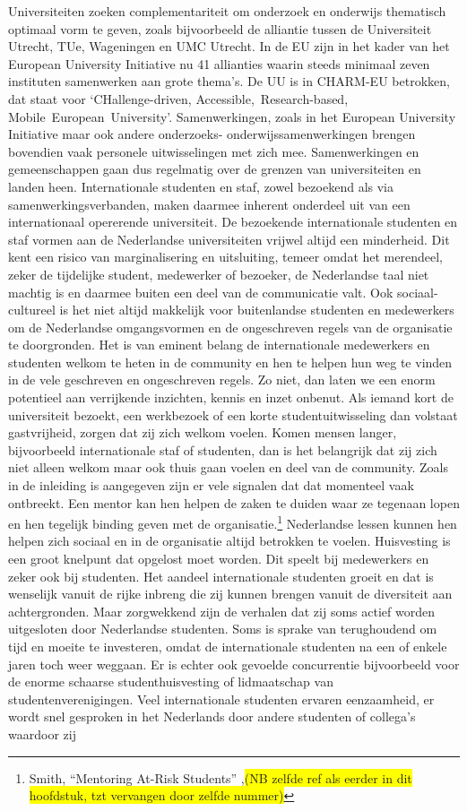 \documentclass{jote-book}
\begin{document}
	Universiteiten zoeken complementariteit om onderzoek en onderwijs thematisch optimaal vorm te geven, zoals bijvoorbeeld de alliantie tussen de Universiteit Utrecht, TUe, Wageningen en UMC Utrecht. In de EU zijn in het kader van het European University Initiative nu 41 allianties waarin steeds minimaal zeven instituten samenwerken aan grote thema's. De UU is in CHARM-EU betrokken, dat staat voor ‘CHallenge-driven, Accessible, Research-based, Mobile European University'. Samenwerkingen, zoals in het European University Initiative maar ook andere onderzoeks- onderwijssamenwerkingen brengen bovendien vaak personele uitwisselingen met zich mee. Samenwerkingen en gemeenschappen gaan dus regelmatig over de grenzen van universiteiten en landen heen. Internationale studenten en staf, zowel bezoekend als via samenwerkingsverbanden, maken daarmee inherent onderdeel uit van een internationaal opererende universiteit. De bezoekende internationale studenten en staf vormen aan de Nederlandse universiteiten vrijwel altijd een minderheid. Dit kent een risico van marginalisering en uitsluiting, temeer omdat het merendeel, zeker de tijdelijke student, medewerker of bezoeker, de Nederlandse taal niet machtig is en daarmee buiten een deel van de communicatie valt. Ook sociaal-cultureel is het niet altijd makkelijk voor buitenlandse studenten en medewerkers om de Nederlandse omgangsvormen en de ongeschreven regels van de organisatie te doorgronden. Het is van eminent belang de internationale medewerkers en studenten welkom te heten in de community en hen te helpen hun weg te vinden in de vele geschreven en ongeschreven regels. Zo niet, dan laten we een enorm potentieel aan verrijkende inzichten, kennis en inzet onbenut. Als iemand kort de universiteit bezoekt, een werkbezoek of een korte studentuitwisseling dan volstaat gastvrijheid, zorgen dat zij zich welkom voelen. Komen mensen langer, bijvoorbeeld internationale staf of studenten, dan is het belangrijk dat zij zich niet alleen welkom maar ook thuis gaan voelen en deel van de community. Zoals in de inleiding is aangegeven zijn er vele signalen dat dat momenteel vaak ontbreekt. Een mentor kan hen helpen de zaken te duiden waar ze tegenaan lopen en hen tegelijk binding geven met de organisatie.\footnote{Smith, “Mentoring At-Risk Students” ,\colorbox{yellow}{(NB zelfde ref als eerder in dit hoofdstuk, }\colorbox{yellow}{tzt}\colorbox{yellow}{ vervangen door zelfde nummer)}} Nederlandse lessen kunnen hen helpen zich sociaal en in de organisatie altijd betrokken te voelen. Huisvesting is een groot knelpunt dat opgelost moet worden. Dit speelt bij medewerkers en zeker ook bij studenten. Het aandeel internationale studenten groeit en dat is wenselijk vanuit de rijke inbreng die zij kunnen brengen vanuit de diversiteit aan achtergronden. Maar zorgwekkend zijn de verhalen dat zij soms actief worden uitgesloten door Nederlandse studenten. Soms is sprake van terughoudend om tijd en moeite te investeren, omdat de internationale studenten na een of enkele jaren toch weer weggaan. Er is echter ook gevoelde concurrentie bijvoorbeeld voor de enorme schaarse studenthuisvesting of lidmaatschap van studentenverenigingen. Veel internationale studenten ervaren eenzaamheid, er wordt snel gesproken in het Nederlands door andere studenten of collega's waardoor zij 
\end{document}
